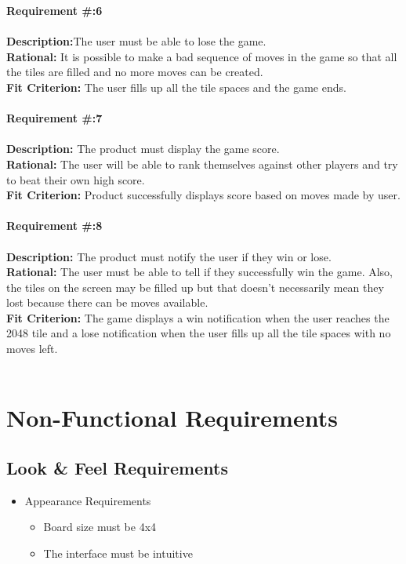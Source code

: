 \documentclass[12pt]{article}
\begin{document}
\textbf {Requirement \#:6} \\\\
\textbf {Description:}The user must be able to lose the game. \\
\textbf {Rational:} It is possible to make a bad sequence of moves in the game so that all the tiles are filled and no more moves can be created.\\
\textbf {Fit Criterion:} The user fills up all the tile spaces and the game ends.\\\\

\textbf {Requirement \#:7}  \\\\
\textbf {Description:} The product must display the game score.\\
\textbf {Rational:} The user will be able to rank themselves against other players and try to beat their own high score.\\
\textbf {Fit Criterion:} Product successfully displays score based on moves made by user.\\\\

\textbf {Requirement \#:8}  \\\\
\textbf {Description:} The product must notify the user if they win or lose.\\
\textbf {Rational:} The user must be able to tell if they successfully win the game. Also, the tiles on the screen may be filled up but that doesn't necessarily mean they lost because there can be moves available. \\
\textbf {Fit Criterion:} The game displays a win notification when the user reaches the 2048 tile and a lose notification when the user fills up all the tile spaces with no moves left. \\\\

\section{Non-Functional Requirements}

\subsection{Look \& Feel Requirements}
\begin{itemize}
    \item Appearance Requirements
    \begin{itemize}
        \item Board size must be 4x4
        \item The interface must be intuitive
    \end{itemize}
\end{itemize}
\end{document}
